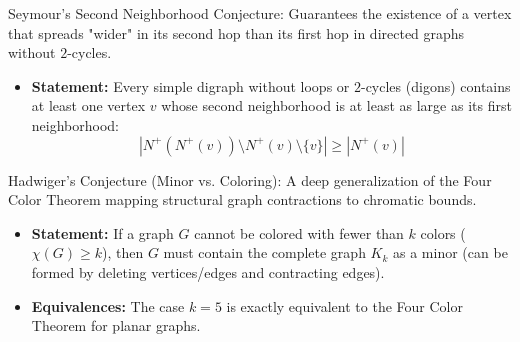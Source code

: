 Seymour's Second Neighborhood Conjecture:
Guarantees the existence of a vertex that spreads "wider" in its second hop than its first hop in directed graphs without $2$-cycles.
\begin{itemize}
    \item \textbf{Statement:} Every simple digraph without loops or $2$-cycles (digons) contains at least one vertex $v$ whose second neighborhood is at least as large as its first neighborhood:
    $$|N^+(N^+(v)) \setminus N^+(v) \setminus \{v\}| \ge |N^+(v)|$$
\end{itemize}

Hadwiger's Conjecture (Minor vs. Coloring):
A deep generalization of the Four Color Theorem mapping structural graph contractions to chromatic bounds.
\begin{itemize}
    \item \textbf{Statement:} If a graph $G$ cannot be colored with fewer than $k$ colors ($\chi(G) \ge k$), then $G$ must contain the complete graph $K_k$ as a minor (can be formed by deleting vertices/edges and contracting edges).
    \item \textbf{Equivalences:} The case $k=5$ is exactly equivalent to the Four Color Theorem for planar graphs.
\end{itemize}
